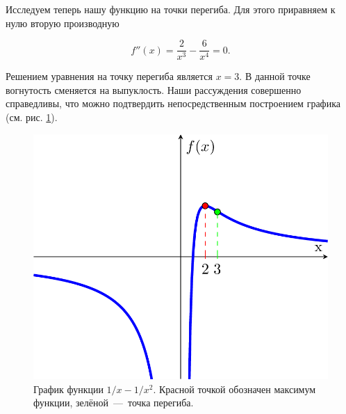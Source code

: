 \documentclass[12pt]{article}
\begin{document}
Исследуем теперь нашу функцию на точки перегиба. Для этого приравняем к нулю вторую производную

\begin{equation}
	f''(x) = \dfrac{2}{x^3} - \dfrac{6}{x^4} = 0.
\end{equation}

Решением уравнения на точку перегиба является $x=3$. В данной точке вогнутость сменяется на выпуклость. Наши рассуждения совершенно справедливы, что можно подтвердить непосредственным построением графика (см. рис. \ref{fig:75}).


\begin{figure}[htbp]
	\centering
	\includegraphics[width=\linewidth]{fig10}
	\caption{График функции ${1}/{x} - {1}/{x^2}$. Красной точкой обозначен максимум функции, зелёной~\----~точка перегиба.}
	\label{fig:75}
\end{figure}
\end{document}
